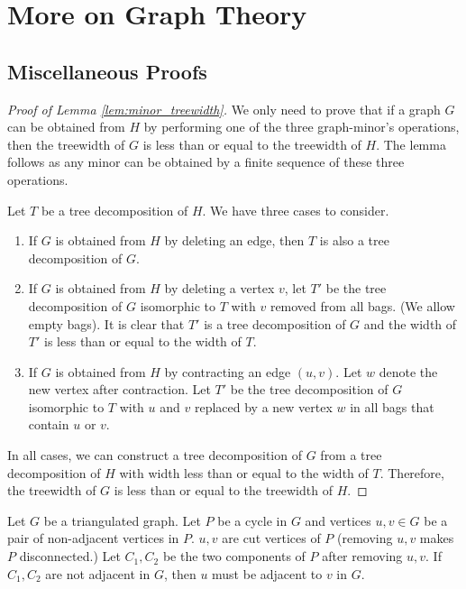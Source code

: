 \chapter{More on Graph Theory} \label{appendix:graph_theory}

\section{Miscellaneous Proofs}\label{sec:proofs}

\begin{proof}[Proof of Lemma \ref{lem:minor_treewidth}]
	We only need to prove that if a graph $G$ can be obtained from $H$ by performing one of the three graph-minor's operations, then the treewidth of $G$ is less than or equal to the treewidth of $H$. The lemma follows as any minor can be obtained by a finite sequence of these three operations.

	Let $T$ be a tree decomposition of $H$.
	We have three cases to consider.
	\begin{enumerate}
		\item If $G$ is obtained from $H$ by deleting an edge, then $T$ is also a tree decomposition of $G$. 
		\item If $G$ is obtained from $H$ by deleting a vertex $v$, let $T'$ be the tree decomposition of $G$ isomorphic to $T$ with $v$ removed from all bags. (We allow empty bags). It is clear that $T'$ is a tree decomposition of $G$ and the width of $T'$ is less than or equal to the width of $T$.
		\item If $G$ is obtained from $H$ by contracting an edge $(u, v)$. Let $w$ denote the new vertex after contraction. 
		Let $T'$ be the tree decomposition of $G$ isomorphic to $T$ with $u$ and $v$ replaced by a new vertex $w$ in all bags that contain $u$ or $v$. 
	\end{enumerate}

	In all cases, we can construct a tree decomposition of $G$ from a tree decomposition of $H$ with width less than or equal to the width of $T$. Therefore, the treewidth of $G$ is less than or equal to the treewidth of $H$.
\end{proof}

\begin{lemma}\label{lem:triangulated_cut_vertices}
	Let $G$ be a triangulated graph. Let $P$ be a cycle in $G$ and vertices $u, v \in G$ be a pair of non-adjacent vertices in $P$. 
	$u, v$ are cut vertices of $P$ (removing $u, v$ makes $P$ disconnected.) 
	Let $C_1, C_2$ be the two components of $P$ after removing $u, v$.
	If $C_1, C_2$ are not adjacent in $G$, then $u$ must be adjacent to $v$ in $G$.
\end{lemma}

